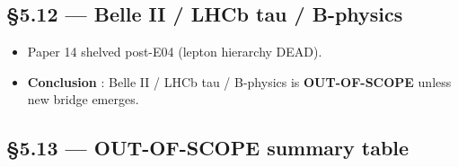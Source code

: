 \documentclass[
  11pt,
  a4paper,
]{article}
\providecommand{\tightlist}{\setlength{\itemsep}{0pt}\setlength{\parskip}{0pt}}
\providecommand{\tightlist}{%
  \setlength{\itemsep}{0pt}\setlength{\parskip}{0pt}}
\begin{document}
\hypertarget{belle-ii-lhcb-tau-b-physics}{%
\subsection{§5.12 --- Belle II / LHCb tau / B-physics}\label{belle-ii-lhcb-tau-b-physics}}

\begin{itemize}
\tightlist
\item
  Paper 14 shelved post-E04 (lepton hierarchy DEAD).
\item
  \textbf{Conclusion} : Belle II / LHCb tau / B-physics is \textbf{OUT-OF-SCOPE} unless new bridge emerges.
\end{itemize}

\hypertarget{out-of-scope-summary-table}{%
\subsection{§5.13 --- OUT-OF-SCOPE summary table}\label{out-of-scope-summary-table}}
\end{document}
